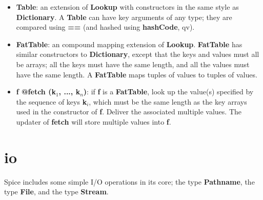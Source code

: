 \documentclass{report}
\begin{document}
\begin{itemize}
\item {\bf Table}: an extension of {\bf Lookup} with constructors in the same style as
{\bf Dictionary}. A {\bf Table} can have key arguments of any type; they are compared
using {\bf ==} (and hashed using {\bf hashCode}, qv).

\item {\bf FatTable}: an compound mapping extension of {\bf Lookup}. {\bf FatTable} has similar
constructors to {\bf Dictionary}, except that the keys and values must all be
arrays; all the keys must have the same length, and all the values must have
the same length. A {\bf FatTable} maps tuples of values to tuples of values.

\item {\bf f @fetch (k$_ 1$, ..., k$_ n$)}: if {\bf f} is a {\bf FatTable}, look up the value(s)
specified by the sequence of keys {\bf k$_ i$}, which must be the same length as the
key arrays used in the constructor of {\bf f}. Deliver the associated multiple
values. The updater of {\bf fetch} will store multiple values into {\bf f}.

\end{itemize}\section{io}


Spice includes some simple I/O operations in its core; the type {\bf Pathname},
the type {\bf File}, and the type {\bf Stream}.
\end{document}
